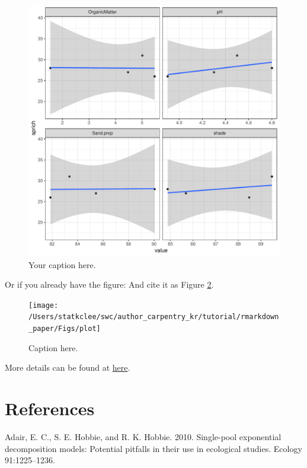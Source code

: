 \documentclass[12pt,]{article}
\begin{document}
\begin{figure}

{\centering \includegraphics{ms_files/figure-latex/figName-1} 

}

\caption{Your caption here.}\label{fig:figName}
\end{figure}

Or if you already have the figure: And cite it as Figure \ref{fig:fig2}.

\begin{figure}

{\centering \texttt{[image: /Users/statkclee/swc/author\_carpentry\_kr/tutorial/rmarkdown\_paper/Figs/plot]} 

}

\caption{Caption here.}\label{fig:fig2}
\end{figure}

More details can be found at
\href{https://bookdown.org/yihui/bookdown/}{here}.

\section*{References}\label{references}

\hypertarget{refs}{}
\hypertarget{ref-adair_single-pool_2010}{}
Adair, E. C., S. E. Hobbie, and R. K. Hobbie. 2010. Single-pool
exponential decomposition models: Potential pitfalls in their use in
ecological studies. Ecology 91:1225--1236.
\end{document}
